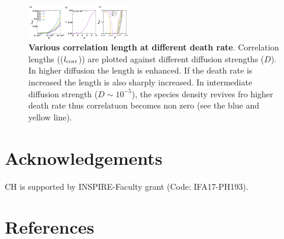 \documentclass[aps, pre, twocolumn, amsmath, superscriptaddress,showkeys,showpacs]{revtex4-1}
\begin{document}
	\begin{figure}
	\includegraphics[width=0.4\textwidth]{Diagram4.png}
	\caption{{\bf Various correlation  length at different death rate}. Correlation lengths (($l_{\rm corr}$)) are plotted against different diffusion strengths ($D$). In higher diffusion the length is enhanced. If the death rate is increased the length is also sharply increased. In intermediate diffusion strength ($D\sim 10^{-5}$), the species density revives fro higher death rate thus correlatuon becomes non zero (see the blue and yellow line). }
	\label{fig4-corr}
	\end{figure}
	\section{Acknowledgements} CH is supported by INSPIRE-Faculty grant (Code: IFA17-PH193). \\
	
	\section{References}
	
	
	
\end{document}
